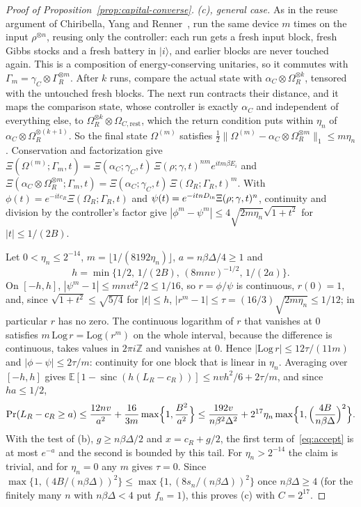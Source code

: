 \documentclass[11pt]{article}
\theoremstyle{definition}
\theoremstyle{remark}
\begin{document}
\begin{proof}[Proof of Proposition~\ref{prop:capital-converse}]
\emph{(c), general case.} As in the reuse argument of Chiribella, Yang and Renner~\cite{ChiribellaYangRenner21}, run the same device $m$ times on the input $\rho^{\otimes n}$, reusing only the controller: each run gets a fresh input block, fresh Gibbs stocks and a fresh battery in $|i\rangle$, and earlier blocks are never touched again. This is a composition of energy-conserving unitaries, so it commutes with $\Gamma_m=\gamma_C\otimes\Gamma_R^{\otimes m}$. After $k$ runs, compare the actual state with $\alpha_C\otimes\Omega_R^{\otimes k}$, tensored with the untouched fresh blocks. The next run contracts their distance, and it maps the comparison state, whose controller is exactly $\alpha_C$ and independent of everything else, to $\Omega_R^{\otimes k}\otimes\Omega_{C,\mathrm{rest}}$, which the return condition puts within $\eta_n$ of $\alpha_C\otimes\Omega_R^{\otimes(k+1)}$. So the final state $\Omega^{(m)}$ satisfies $\tfrac12\|\Omega^{(m)}-\alpha_C\otimes\Omega_R^{\otimes m}\|_1\le m\eta_n$. Conservation and factorization give $\Xi(\Omega^{(m)};\Gamma_m,t)=\Xi(\alpha_C;\gamma_C,t)\,\Xi(\rho;\gamma,t)^{nm}e^{itm\beta E_i}$ and $\Xi(\alpha_C\otimes\Omega_R^{\otimes m};\Gamma_m,t)=\Xi(\alpha_C;\gamma_C,t)\,\Xi(\Omega_R;\Gamma_R,t)^m$. With $\phi(t)=e^{-itc_R}\Xi(\Omega_R;\Gamma_R,t)$ and $\psi(t)=e^{-itnD_{\rm in}}\Xi(\rho;\gamma,t)^n$, continuity and division by the controller's factor give $|\phi^m-\psi^m|\le4\sqrt{2m\eta_n}\sqrt{1+t^2}$ for $|t|\le1/(2B)$.

Let $0<\eta_n\le2^{-14}$, $m=\lfloor1/(8192\eta_n)\rfloor$, $a=n\beta\Delta/4\ge1$ and
\[
h=\min\{1/2,\,1/(2B),\,(8mnv)^{-1/2},\,1/(2a)\}.
\]
On $[-h,h]$, $|\psi^m-1|\le mnvt^2/2\le1/16$, so $r=\phi/\psi$ is continuous, $r(0)=1$, and, since $\sqrt{1+t^2}\le\sqrt{5/4}$ for $|t|\le h$, $|r^m-1|\le\tau=(16/3)\sqrt{2m\eta_n}\le1/12$; in particular $r$ has no zero. The continuous logarithm of $r$ that vanishes at $0$ satisfies $m\,\mathrm{Log}\,r=\mathrm{Log}(r^m)$ on the whole interval, because the difference is continuous, takes values in $2\pi i\mathbb Z$ and vanishes at $0$. Hence $|\mathrm{Log}\,r|\le12\tau/(11m)$ and $|\phi-\psi|\le2\tau/m$: continuity for one block that is linear in $\eta_n$. Averaging over $[-h,h]$ gives $\mathbb E[1-\operatorname{sinc}(h(L_R-c_R))]\le nvh^2/6+2\tau/m$, and since $ha\le1/2$,
\[
\Pr(L_R-c_R\ge a)\le\frac{12nv}{a^2}+\frac{16}{3m}\max\Bigl\{1,\frac{B^2}{a^2}\Bigr\}\le\frac{192v}{n\beta^2\Delta^2}+2^{17}\eta_n\max\Bigl\{1,\Bigl(\frac{4B}{n\beta\Delta}\Bigr)^2\Bigr\}.
\]
With the test of (b), $g\ge n\beta\Delta/2$ and $x=c_R+g/2$, the first term of~\eqref{eq:accept} is at most $e^{-a}$ and the second is bounded by this tail. For $\eta_n>2^{-14}$ the claim is trivial, and for $\eta_n=0$ any $m$ gives $\tau=0$. Since $\max\{1,(4B/(n\beta\Delta))^2\}\le\max\{1,(8s_n/(n\beta\Delta))^2\}$ once $n\beta\Delta\ge4$ (for the finitely many $n$ with $n\beta\Delta<4$ put $f_n=1$), this proves (c) with $C=2^{17}$.


\end{proof}
\end{document}
